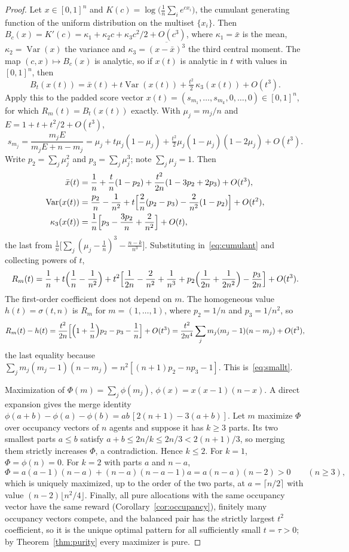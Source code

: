 \documentclass[11pt]{article}
\theoremstyle{plain}
\theoremstyle{definition}
\theoremstyle{remark}
\DeclareMathOperator{\Var}{Var}
\begin{document}
\begin{proof}
Let $x\in[0,1]^n$ and $K(c)=\log\bigl(\frac1n\sum_ie^{cx_i}\bigr)$, the cumulant generating function of the uniform distribution on the multiset $\{x_i\}$. Then $B_c(x)=K'(c)=\kappa_1+\kappa_2c+\kappa_3c^2/2+O(c^3)$, where $\kappa_1=\bar x$ is the mean, $\kappa_2=\Var(x)$ the variance and $\kappa_3=\overline{(x-\bar x)^3}$ the third central moment. The map $(c,x)\mapsto B_c(x)$ is analytic, so if $x(t)$ is analytic in $t$ with values in $[0,1]^n$, then
\begin{equation}\label{eq:cumulant}
 B_t(x(t))=\bar x(t)+t\Var(x(t))+\tfrac{t^2}2\,\kappa_3(x(t))+O(t^3).
\end{equation}
Apply this to the padded score vector $x(t)=(s_{m_1},\dots,s_{m_k},0,\dots,0)\in[0,1]^n$, for which $R_m(t)=B_t(x(t))$ exactly. With $\mu_j=m_j/n$ and $E=1+t+t^2/2+O(t^3)$,
\[
 s_{m_j}=\frac{m_jE}{m_jE+n-m_j}=\mu_j+t\mu_j(1-\mu_j)+\tfrac{t^2}2\mu_j(1-\mu_j)(1-2\mu_j)+O(t^3).
\]
Write $p_2=\sum_j\mu_j^2$ and $p_3=\sum_j\mu_j^3$; note $\sum_j\mu_j=1$. Then
\begin{align*}
 \bar x(t)&=\frac1n+\frac tn(1-p_2)+\frac{t^2}{2n}(1-3p_2+2p_3)+O(t^3),\\
 \Var(x(t))&=\frac{p_2}n-\frac1{n^2}+t\Bigl[\frac2n(p_2-p_3)-\frac2{n^2}(1-p_2)\Bigr]+O(t^2),\\
 \kappa_3(x(t))&=\frac1n\Bigl[p_3-\frac{3p_2}n+\frac2{n^2}\Bigr]+O(t),
\end{align*}
the last from $\frac1n\bigl[\sum_j(\mu_j-\frac1n)^3-\frac{n-k}{n^3}\bigr]$. Substituting in~\eqref{eq:cumulant} and collecting powers of $t$,
\[
 R_m(t)=\frac1n+t\Bigl(\frac1n-\frac1{n^2}\Bigr)+t^2\Bigl[\frac1{2n}-\frac2{n^2}+\frac1{n^3}+p_2\Bigl(\frac1{2n}+\frac1{2n^2}\Bigr)-\frac{p_3}{2n}\Bigr]+O(t^3).
\]
The first-order coefficient does not depend on $m$. The homogeneous value $h(t)=\sigma(t,n)$ is $R_m$ for $m=(1,\dots,1)$, where $p_2=1/n$ and $p_3=1/n^2$, so
\[
 R_m(t)-h(t)=\frac{t^2}{2n}\Bigl[\Bigl(1+\frac1n\Bigr)p_2-p_3-\frac1n\Bigr]+O(t^3)=\frac{t^2}{2n^4}\sum_jm_j(m_j-1)(n-m_j)+O(t^3),
\]
the last equality because $\sum_jm_j(m_j-1)(n-m_j)=n^2[(n+1)p_2-np_3-1]$. This is~\eqref{eq:smallt}.

Maximization of $\Phi(m)=\sum_j\phi(m_j)$, $\phi(x)=x(x-1)(n-x)$. A direct expansion gives the merge identity $\phi(a+b)-\phi(a)-\phi(b)=ab\,[2(n+1)-3(a+b)]$. Let $m$ maximize $\Phi$ over occupancy vectors of $n$ agents and suppose it has $k\ge3$ parts. Its two smallest parts $a\le b$ satisfy $a+b\le2n/k\le2n/3<2(n+1)/3$, so merging them strictly increases $\Phi$, a contradiction. Hence $k\le2$. For $k=1$, $\Phi=\phi(n)=0$. For $k=2$ with parts $a$ and $n-a$,
\[
 \Phi=a(a-1)(n-a)+(n-a)(n-a-1)a=a(n-a)(n-2)>0\qquad(n\ge3),
\]
which is uniquely maximized, up to the order of the two parts, at $a=\lceil n/2\rceil$ with value $(n-2)\lfloor n^2/4\rfloor$. Finally, all pure allocations with the same occupancy vector have the same reward (Corollary~\ref{cor:occupancy}), finitely many occupancy vectors compete, and the balanced pair has the strictly largest $t^2$ coefficient, so it is the unique optimal pattern for all sufficiently small $t=\tau>0$; by Theorem~\ref{thm:purity} every maximizer is pure.
\end{proof}
\end{document}
